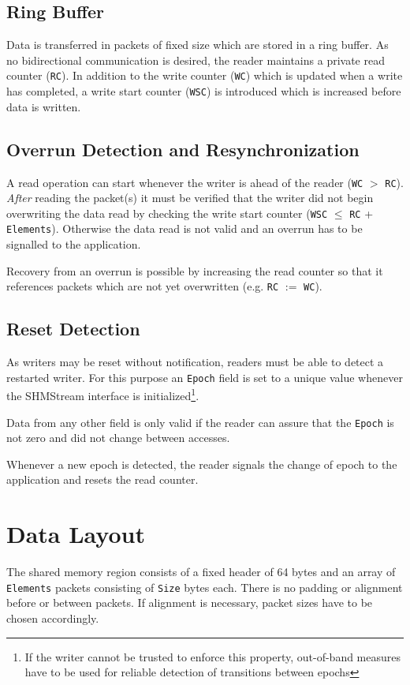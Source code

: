 \documentclass[a4paper,twoside,titlepage]{article}
\begin{document}
\subsection{Ring Buffer}
Data is transferred in packets of fixed size which are stored in a ring buffer.
As no bidirectional communication is desired, the reader maintains a private
read counter (\texttt{RC}).  In addition to the write counter (\texttt{WC})
which is updated when a write has completed, a write start counter
(\texttt{WSC}) is introduced which is increased before data is written.

\subsection{Overrun Detection and Resynchronization}
A read operation can start whenever the writer is ahead of the reader
(\texttt{WC} $>$ \texttt{RC}).  \emph{After} reading the packet(s) it must be
verified that the writer did not begin overwriting the data read by checking
the write start counter (\texttt{WSC} $\le$ \texttt{RC} + \texttt{Elements}).
Otherwise the data read is not valid and an overrun has to be signalled to the
application.

Recovery from an overrun is possible by increasing the read counter so that it
references packets which are not yet overwritten (e.g. \texttt{RC} $:=$
\texttt{WC}).

\subsection{Reset Detection}
As writers may be reset without notification, readers must be able to detect a
restarted writer.  For this purpose an \texttt{Epoch} field is set to a unique
value whenever the SHMStream interface is initialized\footnote{If the writer
cannot be trusted to enforce this property, out-of-band measures have to be
used for reliable detection of transitions between epochs}.

Data from any other field is only valid if the reader can assure that the
\texttt{Epoch} is not zero and did not change between accesses.

Whenever a new epoch is detected, the reader signals the change of epoch to the
application and resets the read counter.

\section{Data Layout}
The shared memory region consists of a fixed header of 64 bytes and an array of
\texttt{Elements} packets consisting of \texttt{Size} bytes each. There is no
padding or alignment before or between packets.  If alignment is necessary,
packet sizes have to be chosen accordingly.
\end{document}
